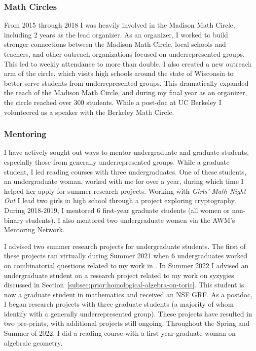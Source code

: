 \documentclass[11pt,reqno]{amsart}
\theoremstyle{remark}
\begin{document}
\subsubsection{Math Circles}
	From 2015 through 2018 I was heavily involved in the Madison Math Circle, including  2 years as the lead organizer. As an organizer, I worked to build stronger connections between the Madison Math Circle, local schools and teachers, and other outreach organizations focused on underrepresented groups. This led to weekly attendance to more than double. I also created a new outreach arm of the circle, which visits high schools around the state of Wisconsin to better serve students from underrepresented groups. This dramatically expanded the reach of the Madison Math Circle, and during my final year as an organizer, the circle reached over 300 students. While a post-doc at UC Berkeley I volunteered as a speaker with the Berkeley Math Circle. 

\subsubsection{Mentoring}
I have actively sought out ways to mentor undergraduate and graduate students, especially those from generally underrepresented groups. While a graduate student, I led reading courses with three undergraduates. One of these students, an undergraduate woman, worked with me for over a year, during which time I helped her apply for summer research projects. Working with \textit{Girls' Math Night Out} I lead two girls in high school through a project exploring cryptography. During 2018-2019, I mentored 6 first-year graduate students (all women or non-binary students). I also mentored two undergraduate women via the AWM's Mentoring Network. 

I advised two summer research projects for undergraduate students. The first of these projects ran virtually during Summer 2021 when 6 undergraduates worked on combinatorial questions related to my work in \cite{BBCMMW24}. In Summer 2022 I advised an undergraduate student on a research project related to my work on syzygies discussed in Section~\ref{subsec:prior:homological-algebra-on-toric}. This student is now a graduate student in mathematics and received an NSF GRF. As a postdoc, I began research projects with three graduate students (a majority of whom identify with a generally underrepresented group). These projects have resulted in two pre-prints, with additional projects still ongoing. Throughout the Spring and Summer of 2022, I did a reading course with a first-year graduate woman on algebraic geometry.
\end{document}
